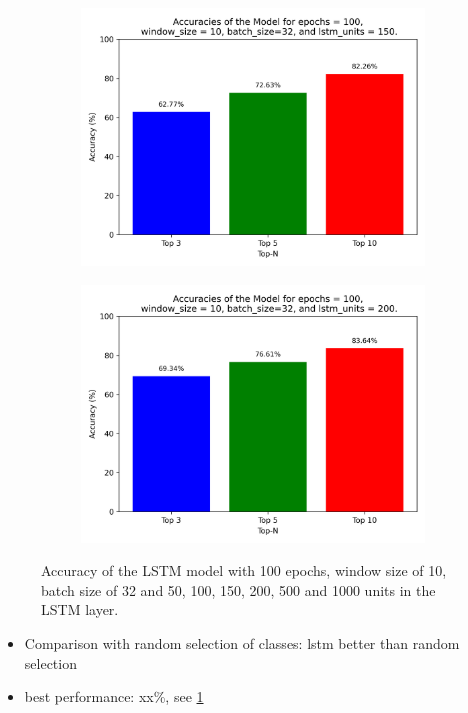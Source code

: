 \begin{figure}[h!]
    \begin{subfigure}[b]{0.45\textwidth}
        \centering
        \includegraphics[scale=0.5]{images/accuracy_epochs_100_window_10_batch_32_lstm_150.png}
    \end{subfigure}
    \hfill
    \begin{subfigure}[b]{0.45\textwidth}
        \centering
        \includegraphics[scale=0.5]{images/accuracy_epochs_100_window_10_batch_32_lstm_200.png}
    \end{subfigure}


    \caption{Accuracy of the LSTM model with 100 epochs, window size of 10, batch size of 32 and {50, 100, 150, 200, 500 and 1000} units in the LSTM layer.}
    \label{fig:accuracy_epochs_100_window_10_batch_32_lstm_x}
\end{figure}



\begin{itemize}
    \item Comparison with random selection of classes: lstm better than random selection
    \item best performance: xx\%, see \cref{fig:accuracy_epochs_100_window_10_batch_32_lstm_x}
\end{itemize}

